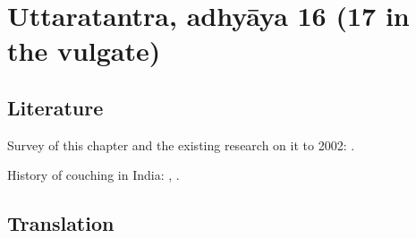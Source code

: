 \section{Uttaratantra, adhyāya 16 (17 in the vulgate)}

\subsection{Literature}

Survey of this chapter and the existing research 
on it to 2002: \cites[IA, 305--306]{meul-hist}.

History of couching in India: \cite{wujad-2019,
    desh-2000,
    desh-1999,
    bret-1826,
    leff-2020,
    shas-kaly,
    jack-1884,
    scot-1817,
    elli-1918,
    hend-1895,
}, \cite[65--67]{wuja-2003}.


\subsection{Translation}

